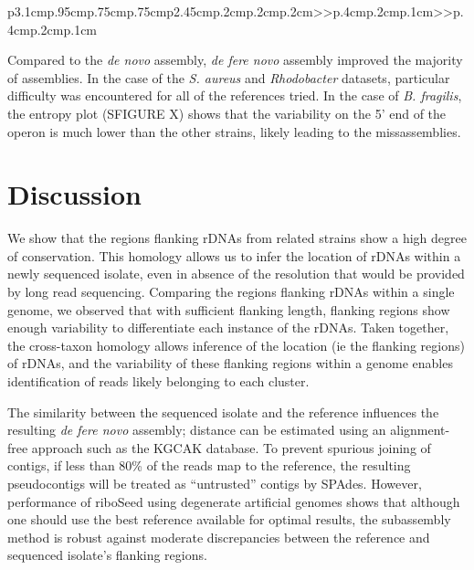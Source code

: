 \documentclass[10pt]{article}
\begin{document}
\begin{linenumbers}
\begin{table}[]
{\begin{tabular}{p{3.1cm}p{.95cm}p{.75cm}p{.75cm}p{2.45cm}p{.2cm}p{.2cm}p{.2cm}>{\color{black}}>{\hfill}p{.4cm}p{.2cm}p{.1cm}>{\color{black}}>{\hfill}p{.4cm}p{.2cm}p{.1cm}}
    \bottomrule
  \end{tabular}
  }
\end{table}

Compared to the \textit{de novo} assembly, \textit{de fere novo} assembly improved the majority of assemblies. In the case of the \textit{S. aureus} and \textit{Rhodobacter} datasets, particular difficulty was encountered for all of the references tried. In the case of \textit{B. fragilis}, the entropy plot (SFIGURE X) shows that the variability on the 5’ end of the operon is much lower than the other strains, likely leading to the missassemblies.


\section*{Discussion}
We show that the regions flanking rDNAs from related strains show a high degree of conservation. This homology allows us to infer the location of rDNAs within a newly sequenced isolate, even in absence of the resolution that would be provided by long read sequencing. Comparing the regions flanking rDNAs within a single genome, we observed that with sufficient flanking length, flanking regions show enough variability to differentiate each instance of the rDNAs. Taken together, the cross-taxon homology allows inference of the location (ie the flanking regions) of rDNAs, and the variability of these flanking regions within a genome enables identification of reads likely belonging to each cluster.


The similarity between the sequenced isolate and the reference influences the resulting \textit{de fere novo} assembly; distance can be estimated using an alignment-free approach such as the KGCAK database\cite{Wang2015b}. To prevent spurious joining of contigs, if less than 80\% of the reads map to the reference, the resulting pseudocontigs will be treated as ``untrusted'' contigs by SPAdes. However, performance of riboSeed using degenerate artificial genomes shows that although one should use the best reference available for optimal results, the subassembly method is robust against moderate discrepancies between the reference and sequenced isolate’s flanking regions.




\end{linenumbers}
\end{document}

